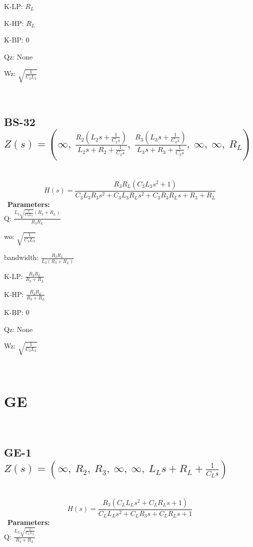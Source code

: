 \documentclass{article}
\begin{document}
K-LP: $R_{L}$\ 

K-HP: $R_{L}$\ 

K-BP: $0$\ 

Qz: $\text{None}$\ 

Wz: $\sqrt{\frac{1}{C_{3} L_{3}}}$\ 

\ 

\subsection{BS-32 $Z(s) = \left( \infty, \  \frac{R_{2} \left(L_{2} s + \frac{1}{C_{2} s}\right)}{L_{2} s + R_{2} + \frac{1}{C_{2} s}}, \  \frac{R_{3} \left(L_{3} s + \frac{1}{C_{3} s}\right)}{L_{3} s + R_{3} + \frac{1}{C_{3} s}}, \  \infty, \  \infty, \  R_{L}\right)$ } \ 
\textbf{\[H(s) = \frac{R_{3} R_{L} \left(C_{3} L_{3} s^{2} + 1\right)}{C_{3} L_{3} R_{3} s^{2} + C_{3} L_{3} R_{L} s^{2} + C_{3} R_{3} R_{L} s + R_{3} + R_{L}}\] } \ 
\textbf{Parameters:}\\ 

Q: $\frac{L_{3} \sqrt{\frac{1}{C_{3} L_{3}}} \left(R_{3} + R_{L}\right)}{R_{3} R_{L}}$\ 

wo: $\sqrt{\frac{1}{C_{3} L_{3}}}$\ 

bandwidth: $\frac{R_{3} R_{L}}{L_{3} \left(R_{3} + R_{L}\right)}$\ 

K-LP: $\frac{R_{3} R_{L}}{R_{3} + R_{L}}$\ 

K-HP: $\frac{R_{3} R_{L}}{R_{3} + R_{L}}$\ 

K-BP: $0$\ 

Qz: $\text{None}$\ 

Wz: $\sqrt{\frac{1}{C_{3} L_{3}}}$\ 

\ 

\section{GE}\ 
\subsection{GE-1 $Z(s) = \left( \infty, \  R_{2}, \  R_{3}, \  \infty, \  \infty, \  L_{L} s + R_{L} + \frac{1}{C_{L} s}\right)$ } \ 
\textbf{\[H(s) = \frac{R_{3} \left(C_{L} L_{L} s^{2} + C_{L} R_{L} s + 1\right)}{C_{L} L_{L} s^{2} + C_{L} R_{3} s + C_{L} R_{L} s + 1}\] } \ 
\textbf{Parameters:}\\ 

Q: $\frac{L_{L} \sqrt{\frac{1}{C_{L} L_{L}}}}{R_{3} + R_{L}}$\ 
\end{document}
